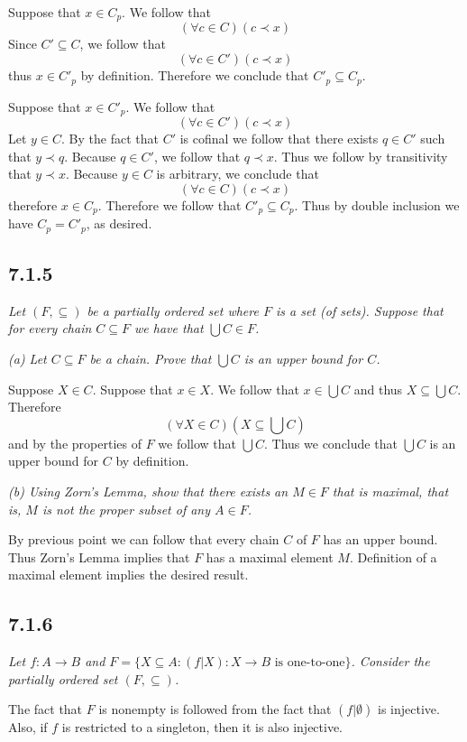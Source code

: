 \documentclass[11pt,oneside,titlepage]{book}
\newcommand{\set}[1]{\{ #1 \}}
\begin{document}
Suppose that $x \in C_p$. We follow that
$$(\forall c \in C)(c \prec x)$$
Since $C' \subseteq C$, we follow that
$$(\forall c \in C')(c \prec x)$$
thus $x \in C'_p$ by definition. Therefore we conclude that  $C'_p \subseteq C_p$.

Suppose that $x \in C'_p$. We follow that
$$(\forall c \in C')(c \prec x)$$
Let $y \in C$. By the fact that $C'$ is cofinal we follow that there exists $q \in C'$ such that
$y \prec q$. Because $q \in C'$, we follow that $q \prec x$. Thus we follow by transitivity
that $y \prec x$. Because $y \in C$ is arbitrary, we conclude that
$$(\forall c \in C)(c \prec x)$$
therefore $x \in C_p$. Therefore we follow that $C'_p \subseteq C_p$. Thus by double
inclusion we have $C_p = C'_p$, as desired.

\subsection*{7.1.5}

\textit{Let $(F, \subseteq)$ be a partially ordered set where $F$ is a set (of sets).
  Suppose that for every chain $C \subseteq F$ we have that $\bigcup{C} \in F$. 
}

\textit{(a) Let $C \subseteq F$ be a chain.
  Prove that $\bigcup{C}$ is an upper bound for $C$.}

Suppose $X \in C$. Suppose that $x \in X$. We follow that $x \in \bigcup{C}$ and
thus $X \subseteq \bigcup{C}$. Therefore
$$(\forall X \in C)(X \subseteq \bigcup{C})$$
and by the properties of $F$ we follow that $\bigcup{C}$. Thus we conclude that $\bigcup{C}$
is an upper bound for $C$ by definition.

\textit{(b) Using Zorn's Lemma, show that there exists an $M \in F$ that is
  maximal, that is, $M$ is not the proper subset of any $A \in F$.}

By previous point we can follow that every chain $C$ of $F$ has an upper bound. Thus
Zorn's Lemma implies that $F$ has a maximal element $M$. Definition of a maximal
element implies the desired result.

\subsection*{7.1.6}

\textit{Let $f: A \to B$ and $F = \set{X \subseteq A: (f|X): X \to B \text{ is one-to-one}}$.
  Consider the  partially ordered set $(F, \subseteq)$.}

The fact that $F$ is nonempty is followed from the fact that $(f|\emptyset)$ is injective.
Also, if $f$ is restricted to a singleton, then it is also injective.
\end{document}
